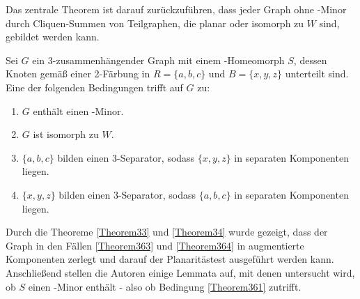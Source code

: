 Das zentrale Theorem ist darauf zurückzuführen, dass jeder Graph ohne \kf-Minor durch Cliquen-Summen von Teilgraphen, die planar oder isomorph zu $W$ sind, gebildet werden kann.\cite{Wag37}
\begin{theorem}\label{Theorem36}
  Sei $G$ ein $3$-zusammenhängender Graph mit einem \kdd-Homeomorph $S$, dessen Knoten gemäß einer 2-Färbung in $R = \{a, b, c\}$ und $B = \{x, y, z\}$ unterteilt sind.
  Eine der folgenden Bedingungen trifft auf $G$ zu:
  \begin{enumerate}
    \item $G$ enthält einen \kf-Minor.\label{Theorem361}
    \item $G$ ist isomorph zu $W$.\label{Theorem362}
    \item $\{a, b, c\}$ bilden einen $3$-Separator, sodass $\{x, y, z\}$ in separaten Komponenten liegen.\label{Theorem363}
    \item $\{x, y, z\}$ bilden einen $3$-Separator, sodass $\{a, b, c\}$ in separaten Komponenten liegen.\label{Theorem364}
  \end{enumerate}
\end{theorem}
Durch die Theoreme \ref{Theorem33} und \ref{Theorem34} wurde gezeigt, dass der Graph in den Fällen \ref{Theorem363} und \ref{Theorem364} in augmentierte Komponenten zerlegt und darauf der Planaritästest ausgeführt werden kann.
Anschließend stellen die Autoren einige Lemmata auf, mit denen untersucht wird, ob $S$ einen \kf-Minor enthält - also ob Bedingung \ref{Theorem361} zutrifft.

